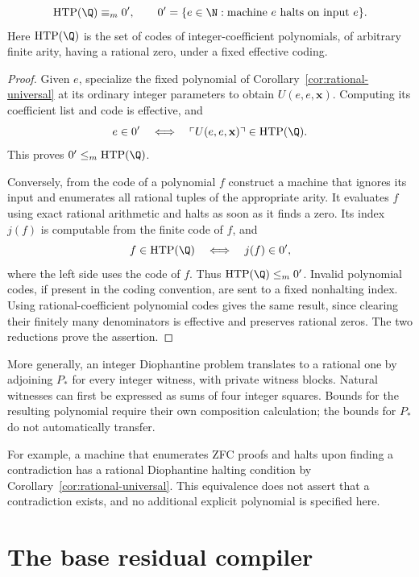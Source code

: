 \begin{corollary}
\label{cor:htp-degree}
\[
 \operatorname{HTP}(\Q)\equiv_m 0',
 \qquad 0'=\{e\in\N:\text{machine $e$ halts on input $e$}\}.
\]
Here $\operatorname{HTP}(\Q)$ is the set of codes of integer-coefficient
polynomials, of arbitrary finite arity, having a rational zero, under a
fixed effective coding.
\end{corollary}
\begin{proof}
Given $e$, specialize the fixed polynomial of
Corollary~\ref{cor:rational-universal} at its ordinary integer parameters
to obtain $U(e,e,\mathbf x)$. Computing its coefficient list and code is
effective, and
\[
 e\in0'\quad\Longleftrightarrow\quad
 \ulcorner U(e,e,\mathbf x)\urcorner\in\operatorname{HTP}(\Q).
\]
This proves $0'\le_m\operatorname{HTP}(\Q)$.

Conversely, from the code of a polynomial $f$ construct a machine that
ignores its input and enumerates all rational tuples of the appropriate
arity. It evaluates $f$ using exact rational arithmetic and halts as soon
as it finds a zero. Its index $j(f)$ is computable from the finite code
of $f$, and
\[
 f\in\operatorname{HTP}(\Q)\quad\Longleftrightarrow\quad j(f)\in0',
\]
where the left side uses the code of $f$. Thus
$\operatorname{HTP}(\Q)\le_m0'$. Invalid polynomial codes, if present in
the coding convention, are sent to a fixed nonhalting index. Using
rational-coefficient polynomial codes gives the same result, since
clearing their finitely many denominators is effective and preserves
rational zeros. The two reductions prove the assertion.
\end{proof}

More generally, an integer Diophantine problem translates to a rational
one by adjoining $P_*$ for every integer witness, with private witness
blocks. Natural witnesses can first be expressed as sums of four integer
squares. Bounds for the resulting polynomial require their own composition
calculation; the bounds for $P_*$ do not automatically transfer.

For example, a machine that enumerates ZFC proofs and halts upon finding
a contradiction has a rational Diophantine halting condition by
Corollary~\ref{cor:rational-universal}. This equivalence does not assert
that a contradiction exists, and no additional explicit polynomial is
specified here.

\section{The base residual compiler}
\label{sec:degree8-original}

